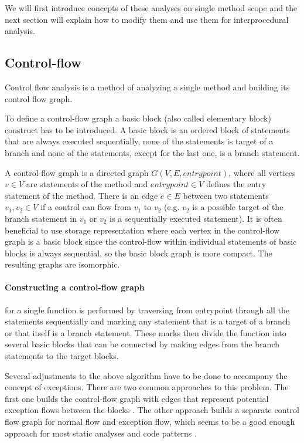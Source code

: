 We will first introduce concepts of these analyses on single method scope and the next section will explain how to modify them and use them for interprocedural analysis.

\subsection{Control-flow}

Control flow analysis is a method of analyzing a single method and building its control flow graph. 

To define a control-flow graph a basic block (also called elementary block) construct has to be introduced. A basic block is an ordered block of statements that are always executed sequentially, none of the statements is target of a branch and none of the statements, except for the last one, is a branch statement.

A control-flow graph is a directed graph $G(V, E, entrypoint)$, where all vertices $v \in V$ are statements of the method and $entrypoint \in V$ defines the entry statement of the method. There is an edge $e \in E$ between two statements $v_1, v_2 \in V$ if a control can flow from $v_1$ to $v_2$ (e.g. $v_2$ is a possible target of the branch statement in $v_1$ or $v_2$ is a sequentially executed statement). It is often beneficial to use storage representation where each vertex in the control-flow graph is a basic block since the control-flow within individual statements of basic blocks is always sequential, so the basic block graph is more compact. The resulting graphs are isomorphic.

\paragraph{Constructing a control-flow graph} for a single function is performed by traversing from entrypoint through all the statements sequentially and marking any statement that is a target of a branch or that itself is a branch statement. These marks then divide the function into several basic blocks that can be connected by making edges from the branch statements to the target blocks.

Several adjustments to the above algorithm have to be done to accompany the concept of exceptions. There are two common approaches to this problem. The first one builds the control-flow graph with edges that represent potential exception flows between the blocks \citep{Sinha2000}. The other approach builds a separate control flow graph for normal flow and exception flow, which seems to be a good enough approach for most static analyses and code patterns \citep{Jo_constructingcontrol}.

